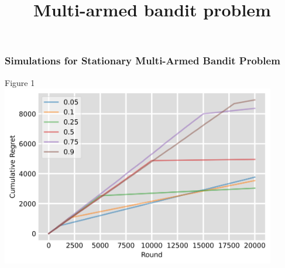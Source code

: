 \documentclass{beamer}
\title{Multi-armed bandit problem}
\subtitle{}
\author{}
\institute %
{}
\date %
{}
\begin{document}
    \begin{frame}
        \frametitle{Simulations for Stationary Multi-Armed Bandit Problem}
        Figure 1
        \includegraphics[width=0.9\textwidth]{../report/figures/epsilon_plot.png}
    \end{frame}
\end{document}

